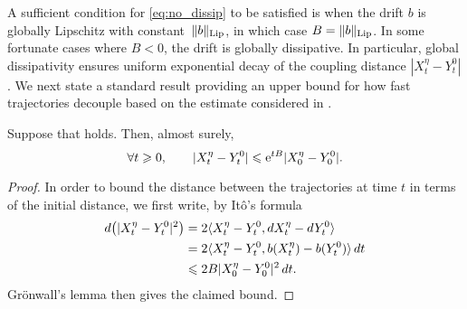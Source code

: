A sufficient condition for \eqref{eq:no_dissip} to be satisfied is when the drift $b$ is globally Lipschitz with constant~$\|b\|_{\rm Lip}$, in which case $B = \|b\|_{\rm Lip}$. In some fortunate cases where $B<0$, the drift is globally dissipative. In particular, global dissipativity ensures uniform exponential decay of the coupling distance $|X_t^\eta - Y_t^0|$.  %
%
We next state a standard result providing an upper bound for how fast trajectories decouple based on the estimate considered in .

\begin{lemma}
	\label{lemma:decoupling_times}
	Suppose that  holds. Then, almost surely,
	\begin{equation}
		\forall t\geqslant 0, \qquad |X_t^\eta - Y_t^0| \leqslant \mathrm{e}^{tB}|X_0^\eta - Y_0^0|.
	\label{eq:gronwall_decouple}
	\end{equation}
\end{lemma}

\begin{proof}%
	In order to bound the distance between the trajectories at time $t$ in terms of the initial distance, we first write, by It\^o's formula
	\begin{align}
		d\bigl(|X_t^\eta - Y_t^0|^2\bigr) &= 2\langle X_t^\eta - Y_t^0, dX_t^\eta - dY^0_t\rangle \\
		&= 2\langle X_t^\eta - Y_t^0, b(X_t^\eta) - b(Y_t^0)\rangle \, dt \\
		&\leqslant 2B|X_0^\eta - Y_0^0|^2 \, dt.
		\label{eq:ito_dissip}
	\end{align}
	Gr\"onwall's lemma then gives the claimed bound. %
\end{proof}

